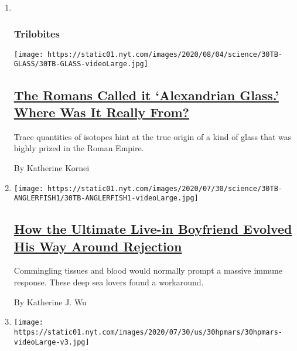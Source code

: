 \begin{enumerate}
\def\labelenumi{\arabic{enumi}.}
\item ~
  \hypertarget{trilobites-1}{%
  \subsubsection{Trilobites}\label{trilobites-1}}

  \texttt{[image: https://static01.nyt.com/images/2020/08/04/science/30TB-GLASS/30TB-GLASS-videoLarge.jpg]}

  \hypertarget{the-romans-called-it-alexandrian-glass-where-was-it-really-from}{%
  \subsection{\texorpdfstring{\href{/2020/07/31/science/alexandrian-glass-rome.html}{The
  Romans Called it `Alexandrian Glass.' Where Was It Really
  From?}}{The Romans Called it `Alexandrian Glass.' Where Was It Really From?}}\label{the-romans-called-it-alexandrian-glass-where-was-it-really-from}}

  Trace quantities of isotopes hint at the true origin of a kind of
  glass that was highly prized in the Roman Empire.

  By Katherine Kornei
\item
  \texttt{[image: https://static01.nyt.com/images/2020/07/30/science/30TB-ANGLERFISH1/30TB-ANGLERFISH1-videoLarge.jpg]}

  \hypertarget{how-the-ultimate-live-in-boyfriend-evolved-his-way-around-rejection}{%
  \subsection{\texorpdfstring{\href{/2020/07/30/science/anglerfish-immune-rejection.html}{How
  the Ultimate Live-in Boyfriend Evolved His Way Around
  Rejection}}{How the Ultimate Live-in Boyfriend Evolved His Way Around Rejection}}\label{how-the-ultimate-live-in-boyfriend-evolved-his-way-around-rejection}}

  Commingling tissues and blood would normally prompt a massive immune
  response. These deep sea lovers found a workaround.

  By Katherine J. Wu
\item
  \texttt{[image: https://static01.nyt.com/images/2020/07/30/us/30hpmars/30hpmars-videoLarge-v3.jpg]}

  \hypertarget{nasa-launches-perseverance-rover-capping-summer-of-missions-to-mars}{%
}
\end{enumerate}
